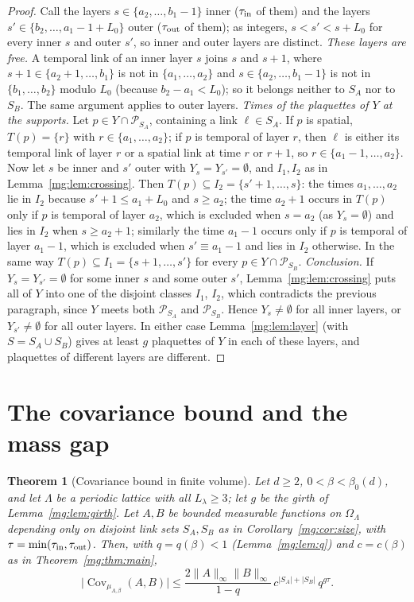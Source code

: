\documentclass[11pt,a4paper]{article}
\newtheorem{theorem}{Theorem}[section]
\theoremstyle{definition}
\theoremstyle{remark}
\DeclareMathOperator{\Cov}{Cov}
\newcommand{\cP}{\mathcal{P}}
\newcommand{\norm}[1]{\lVert #1\rVert}
\begin{document}
\begin{proof}
Call the layers $s\in\{a_2,\dots,b_1-1\}$ inner ($\tau_{\rm in}$ of them) and the layers $s'\in\{b_2,\dots,a_1-1+L_0\}$ outer
($\tau_{\rm out}$ of them); as integers, $s<s'<s+L_0$ for every inner $s$ and outer $s'$, so inner and outer layers are distinct.
\emph{These layers are free.} A temporal link of an inner layer $s$ joins $s$ and $s+1$, where $s+1\in\{a_2+1,\dots,b_1\}$ is not in
$\{a_1,\dots,a_2\}$ and $s\in\{a_2,\dots,b_1-1\}$ is not in $\{b_1,\dots,b_2\}$ modulo $L_0$ (because $b_2-a_1<L_0$); so it belongs neither
to $S_A$ nor to $S_B$. The same argument applies to outer layers.
\emph{Times of the plaquettes of $Y$ at the supports.} Let $p\in Y\cap\cP_{S_A}$, containing a link $\ell\in S_A$. If $p$ is spatial,
$T(p)=\{r\}$ with $r\in\{a_1,\dots,a_2\}$; if $p$ is temporal of layer $r$, then $\ell$ is either its temporal link of layer $r$ or a
spatial link at time $r$ or $r+1$, so $r\in\{a_1-1,\dots,a_2\}$. Now let $s$ be inner and $s'$ outer with $Y_s=Y_{s'}=\emptyset$, and
$I_1,I_2$ as in Lemma~\ref{mg:lem:crossing}. Then $T(p)\subseteq I_2=\{s'+1,\dots,s\}$: the times $a_1,\dots,a_2$ lie in $I_2$ because
$s'+1\le a_1+L_0$ and $s\ge a_2$; the time $a_2+1$ occurs in $T(p)$ only if $p$ is temporal of layer $a_2$, which is excluded when
$s=a_2$ (as $Y_s=\emptyset$) and lies in $I_2$ when $s\ge a_2+1$; similarly the time $a_1-1$ occurs only if $p$ is temporal of layer
$a_1-1$, which is excluded when $s'\equiv a_1-1$ and lies in $I_2$ otherwise. In the same way $T(p)\subseteq I_1=\{s+1,\dots,s'\}$ for
every $p\in Y\cap\cP_{S_B}$.
\emph{Conclusion.} If $Y_s=Y_{s'}=\emptyset$ for some inner $s$ and some outer $s'$, Lemma~\ref{mg:lem:crossing} puts all of $Y$ into one
of the disjoint classes $I_1$, $I_2$, which contradicts the previous paragraph, since $Y$ meets both $\cP_{S_A}$ and $\cP_{S_B}$. Hence
$Y_s\neq\emptyset$ for all inner layers, or $Y_{s'}\neq\emptyset$ for all outer layers. In either case Lemma~\ref{mg:lem:layer} (with
$S=S_A\cup S_B$) gives at least $g$ plaquettes of $Y$ in each of these layers, and plaquettes of different layers are different.
\end{proof}

\section{The covariance bound and the mass gap}\label{mg:sec:main}

\begin{theorem}[Covariance bound in finite volume]\label{mg:thm:finite}
Let $d\ge2$, $0<\beta<\beta_0(d)$, and let $\Lambda$ be a periodic lattice with all $L_\lambda\ge3$; let $g$ be the girth of
Lemma~\ref{mg:lem:girth}. Let $A,B$ be bounded measurable functions on $\Omega_\Lambda$ depending only on disjoint link sets $S_A,S_B$
as in Corollary~\ref{mg:cor:size}, with $\tau=\min(\tau_{\rm in},\tau_{\rm out})$. Then, with $q=q(\beta)<1$ (Lemma~\ref{mg:lem:q}) and
$c=c(\beta)$ as in Theorem~\ref{mg:thm:main},
\[
\bigl|\Cov_{\mu_{\Lambda,\beta}}(A,B)\bigr|\le\frac{2\norm A_\infty\norm B_\infty}{1-q}\,c^{|S_A|+|S_B|}\,q^{g\tau}.
\]
\end{theorem}
\end{document}
